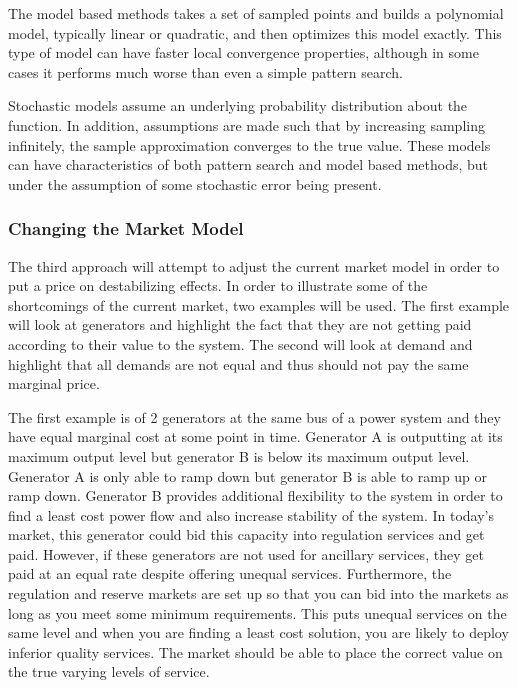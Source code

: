   The model based methods takes a set of sampled points and builds a polynomial model, typically linear or quadratic, and then optimizes this model exactly.  This type of model can have faster local convergence properties, although in some cases it performs much worse than even a simple pattern search.

Stochastic models assume an underlying probability distribution about the function.  In addition, assumptions are made such that by increasing sampling infinitely, the sample approximation converges to the true value.  These models can have characteristics of both pattern search and model based methods, but under the assumption of some stochastic error being present.

\subsubsection{Changing the Market Model}
The third approach will attempt to adjust the current market model in order to put a price on destabilizing effects.  In order to illustrate some of the shortcomings of the current market, two examples will be used.  The first example will look at generators and highlight the fact that they are not getting paid according to their value to the system.  The second will look at demand and highlight that all demands are not equal and thus should not pay the same marginal price.

The first example is of 2 generators at the same bus of a power system and they have equal marginal cost at some point in time.  Generator A is outputting at its maximum output level but generator B is below its maximum output level.  Generator A is only able to ramp down but generator B is able to ramp up or ramp down.  Generator B provides additional flexibility to the system in order to find a least cost power flow and also increase stability of the system.  In today's market, this generator could bid this capacity into regulation services and get paid.  However, if these generators are not used for ancillary services, they get paid at an equal rate despite offering unequal services.   Furthermore, the regulation and reserve markets are set up so that you can bid into the markets as long as you meet some minimum requirements.  This puts unequal services on the same level and when you are finding a least cost solution, you are likely to deploy inferior quality services.  The market should be able to place the correct value on the true varying levels of service.


